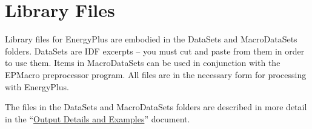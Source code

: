 \section{Library Files}\label{library-files}

Library files for EnergyPlus are embodied in the DataSets and MacroDataSets folders. DataSets are IDF excerpts -- you must cut and paste from them in order to use them. Items in MacroDataSets can be used in conjunction with the EPMacro preprocessor program. All files are in the necessary form for processing with EnergyPlus.

The files in the DataSets and MacroDataSets folders are described in more detail in the ``\href{https://energyplus.readthedocs.io/en/latest/guides/output-details-and-examples/index.html}{Output Details and Examples}'' document.
